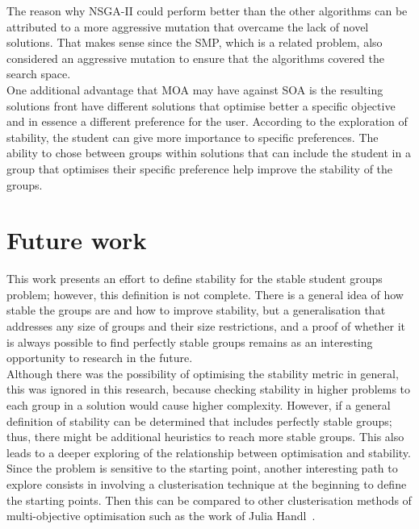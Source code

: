 The reason why NSGA-II could perform better than the other algorithms can be attributed to a more aggressive mutation that overcame the lack of novel solutions. That makes sense since the SMP, which is a related problem, also considered an aggressive mutation to ensure that the algorithms covered the search space.\\

One additional advantage that MOA may have against SOA is the resulting solutions front have different solutions that optimise better a specific objective and in essence a different preference for the user. According to the exploration of stability, the student can give more importance to specific preferences. The ability to chose between groups within solutions that can include the student in a group that optimises their specific preference help improve the stability of the groups.

\section{Future work}

This work presents an effort to define stability for the stable student groups problem; however, this definition is not complete. There is a general idea of how stable the groups are and how to improve stability, but a generalisation that addresses any size of groups and their size restrictions, and a proof of whether it is always possible to find perfectly stable groups remains as an interesting opportunity to research in the future.\\

Although there was the possibility of optimising the stability metric in general, this was ignored in this research, because checking stability in higher problems to each group in a solution would cause higher complexity. However, if a general definition of stability can be determined that includes perfectly stable groups; thus, there might be additional heuristics to reach more stable groups. This also leads to a deeper exploring of the relationship between optimisation and stability.\\

Since the problem is sensitive to the starting point, another interesting path to explore consists in involving a clusterisation technique at the beginning to define the starting points. Then this can be compared to other clusterisation methods of multi-objective optimisation such as the work of Julia Handl~\cite{Handl2006}.\\

